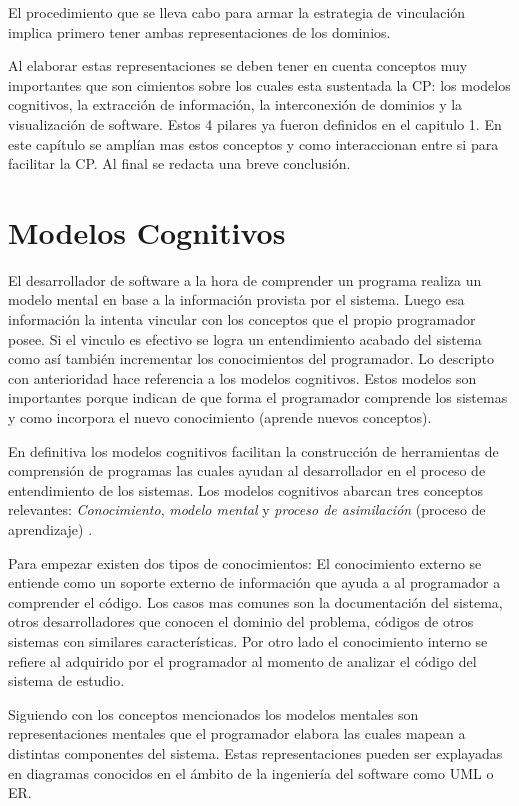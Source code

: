 \documentclass[12pt]{report}
\begin{document}
El procedimiento que se lleva cabo para armar la estrategia de vinculación implica primero tener ambas representaciones de los dominios.
 
Al elaborar estas representaciones se deben tener en cuenta conceptos muy importantes que son cimientos sobre los cuales esta sustentada la CP: los modelos cognitivos, la extracción de información, la interconexión de dominios y la visualización de software. 
Estos 4 pilares ya fueron definidos en el capitulo 1. En este capítulo se amplían mas estos conceptos y como interaccionan entre si para facilitar la CP. Al final se redacta una breve conclusión.

\section{Modelos Cognitivos}


El desarrollador de software a la hora de comprender un programa realiza un modelo mental en base a la información provista por el sistema. Luego esa información la intenta vincular con los conceptos que el propio programador posee. Si el vinculo es efectivo se logra un entendimiento acabado del sistema como así también incrementar los conocimientos del programador. 
Lo descripto con anterioridad hace referencia a los modelos cognitivos. Estos modelos son importantes porque indican de que forma el programador comprende los sistemas y como incorpora el nuevo conocimiento (aprende nuevos conceptos). 

En definitiva los modelos cognitivos facilitan la construcción de herramientas de comprensión de programas las cuales ayudan al desarrollador en el proceso de entendimiento de los sistemas.
Los modelos cognitivos abarcan tres conceptos relevantes: \textit{Conocimiento}, \textit{modelo mental} y \textit{proceso de asimilación} (proceso de aprendizaje) \cite{MAS05}.

Para empezar existen dos tipos de conocimientos:
El conocimiento externo se entiende como un soporte externo de información que ayuda a al programador a comprender el código. Los casos mas comunes son la documentación del sistema, otros desarrolladores que conocen el dominio del problema, códigos de otros sistemas con similares características.
Por otro lado el conocimiento interno se refiere al adquirido por el programador al momento de analizar el código del sistema de estudio.

Siguiendo con los conceptos mencionados los modelos mentales son representaciones mentales que el programador elabora las cuales mapean a distintas componentes del sistema. Estas representaciones pueden ser explayadas en diagramas conocidos en el ámbito de la ingeniería del software como UML o ER.
\end{document}
